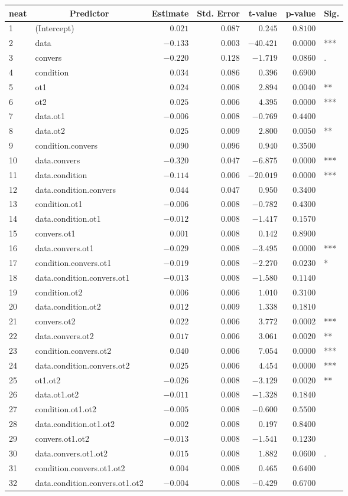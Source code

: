 \begin{table}[!tbp]
\begin{center}
\begin{tabular}{llrrrrl}
\hline\hline
\multicolumn{1}{l}{neat}&\multicolumn{1}{c}{Predictor}&\multicolumn{1}{c}{Estimate}&\multicolumn{1}{c}{Std. Error}&\multicolumn{1}{c}{t-value}&\multicolumn{1}{c}{p-value}&\multicolumn{1}{c}{Sig.}\tabularnewline
\hline
1&(Intercept)&$ 0.021$&$0.087$&$  0.245$&$0.8100$& \tabularnewline
2&data&$-0.133$&$0.003$&$-40.421$&$0.0000$&***\tabularnewline
3&convers&$-0.220$&$0.128$&$ -1.719$&$0.0860$&.\tabularnewline
4&condition&$ 0.034$&$0.086$&$  0.396$&$0.6900$& \tabularnewline
5&ot1&$ 0.024$&$0.008$&$  2.894$&$0.0040$&**\tabularnewline
6&ot2&$ 0.025$&$0.006$&$  4.395$&$0.0000$&***\tabularnewline
7&data.ot1&$-0.006$&$0.008$&$ -0.769$&$0.4400$& \tabularnewline
8&data.ot2&$ 0.025$&$0.009$&$  2.800$&$0.0050$&**\tabularnewline
9&condition.convers&$ 0.090$&$0.096$&$  0.940$&$0.3500$& \tabularnewline
10&data.convers&$-0.320$&$0.047$&$ -6.875$&$0.0000$&***\tabularnewline
11&data.condition&$-0.114$&$0.006$&$-20.019$&$0.0000$&***\tabularnewline
12&data.condition.convers&$ 0.044$&$0.047$&$  0.950$&$0.3400$& \tabularnewline
13&condition.ot1&$-0.006$&$0.008$&$ -0.782$&$0.4300$& \tabularnewline
14&data.condition.ot1&$-0.012$&$0.008$&$ -1.417$&$0.1570$& \tabularnewline
15&convers.ot1&$ 0.001$&$0.008$&$  0.142$&$0.8900$& \tabularnewline
16&data.convers.ot1&$-0.029$&$0.008$&$ -3.495$&$0.0000$&***\tabularnewline
17&condition.convers.ot1&$-0.019$&$0.008$&$ -2.270$&$0.0230$&*\tabularnewline
18&data.condition.convers.ot1&$-0.013$&$0.008$&$ -1.580$&$0.1140$& \tabularnewline
19&condition.ot2&$ 0.006$&$0.006$&$  1.010$&$0.3100$& \tabularnewline
20&data.condition.ot2&$ 0.012$&$0.009$&$  1.338$&$0.1810$& \tabularnewline
21&convers.ot2&$ 0.022$&$0.006$&$  3.772$&$0.0002$&***\tabularnewline
22&data.convers.ot2&$ 0.017$&$0.006$&$  3.061$&$0.0020$&**\tabularnewline
23&condition.convers.ot2&$ 0.040$&$0.006$&$  7.054$&$0.0000$&***\tabularnewline
24&data.condition.convers.ot2&$ 0.025$&$0.006$&$  4.454$&$0.0000$&***\tabularnewline
25&ot1.ot2&$-0.026$&$0.008$&$ -3.129$&$0.0020$&**\tabularnewline
26&data.ot1.ot2&$-0.011$&$0.008$&$ -1.328$&$0.1840$& \tabularnewline
27&condition.ot1.ot2&$-0.005$&$0.008$&$ -0.600$&$0.5500$& \tabularnewline
28&data.condition.ot1.ot2&$ 0.002$&$0.008$&$  0.197$&$0.8400$& \tabularnewline
29&convers.ot1.ot2&$-0.013$&$0.008$&$ -1.541$&$0.1230$& \tabularnewline
30&data.convers.ot1.ot2&$ 0.015$&$0.008$&$  1.882$&$0.0600$&.\tabularnewline
31&condition.convers.ot1.ot2&$ 0.004$&$0.008$&$  0.465$&$0.6400$& \tabularnewline
32&data.condition.convers.ot1.ot2&$-0.004$&$0.008$&$ -0.429$&$0.6700$& \tabularnewline
\hline
\end{tabular}\end{center}
\end{table}
